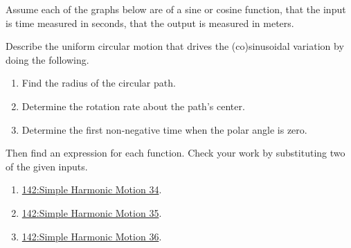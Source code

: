 \documentclass{ximera}
\begin{document}
\begin{exercise} \label{ELDKFeef}
Assume each of the graphs below are of a sine or cosine function, that the input is time measured in seconds, that the output is measured in meters.

Describe the uniform circular motion that drives the (co)sinusoidal variation by doing the following.
 
\begin{enumerate}
\item Find the radius of the circular path.

\item Determine the rotation rate about the path's center.

\item Determine the first non-negative time when the polar angle is zero.

\end{enumerate}

Then find an expression for each function. Check your work by substituting two of the given inputs.


\begin{enumerate}

\item 

\href{https://www.desmos.com/calculator/o37ufo2ev5}{142:Simple Harmonic Motion 34}.

 
\begin{onlineOnly}
    \begin{center}
\end{center}
\end{onlineOnly}


\item 

\href{https://www.desmos.com/calculator/3t8bev0ify}{142:Simple Harmonic Motion 35}.

 
\begin{onlineOnly}
    \begin{center}
\end{center}
\end{onlineOnly}

\item

\href{https://www.desmos.com/calculator/mbphobez3x}{142:Simple Harmonic Motion 36}.

 
\begin{onlineOnly}
    \begin{center}
\end{center}
\end{onlineOnly}


\end{enumerate}

 


\end{exercise}
\end{document}
